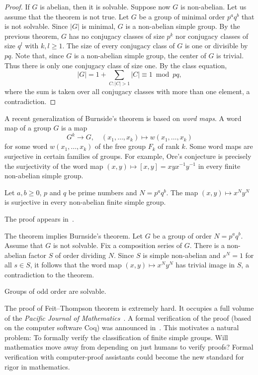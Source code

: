 \begin{proof}
	If $G$ is abelian, then it is solvable.
	Suppose now $G$ is non-abelian.
	Let us assume that the theorem is not true. Let $G$ be a group
	of minimal order $p^aq^b$
	that is not solvable. Since $|G|$ is minimal, $G$ is a non-abelian simple group.
	By the previous theorem, 
	$G$ has no conjugacy classes of size $p^k$ nor 
	conjugacy classes of size $q^l$ with $k,l\geq1$. The size
	of every conjugacy class of $G$ is one or divisible by $pq$. 
	Note that, since $G$ is a non-abelian simple group,
	the center of $G$ is trivial.
	Thus there is only one conjugacy class of size one.
	By the class
	equation,
	\[
		|G|=1+\sum_{C:|C|>1}|C|\equiv 1 \bmod pq,
	\]
	where the sum is taken over all conjugacy classes 
	with more than one element, a contradiction.
\end{proof}

A recent generalization of Burnside's theorem
is based on \emph{word maps}. A word map
of a group $G$ is a map 
\[
G^k\to G,\quad 
(x_1,\dots,x_k)\mapsto w(x_1,\dots,x_k)
\]
for some word $w(x_1,\dots,x_k)$ of the free group $F_k$ of rank $k$. 
Some word maps are surjective in certain families of groups. For example, 
Ore's conjecture is precisely the surjectivity of the word map
$(x,y)\mapsto [x,y]=xyx^{-1}y^{-1}$ in every finite non-abelian simple 
group. 

\begin{theorem}
    Let $a,b\geq0$, $p$ and $q$ be prime numbers and $N=p^aq^b$. The map 
    $(x,y)\mapsto x^Ny^N$ is surjective in every non-abelian 
    finite simple group. 
\end{theorem}

The proof appears in~\cite{MR3827208}. 

The theorem implies Burnside's theorem. Let $G$ be a group of order
$N=p^aq^b$. Assume that $G$ is not solvable. 
Fix a composition series of $G$. There is a non-abelian factor $S$ 
of order dividing $N$. Since 
$S$ is simple non-abelian and $s^N=1$ for all $s\in S$, 
it follows that the word map
$(x,y)\mapsto x^Ny^N$ has trivial image in $S$, a contradiction 
to the theorem. 

\begin{theorem}
    Groups of odd order are solvable. 
\end{theorem}

The proof of Feit--Thompson theorem is extremely hard. 
It occupies a full volume of the 
\emph{Pacific Journal of Mathematics}~\cite{MR166261}. 
A formal verification of the proof 
(based on the computer software Coq) 
was announced in~\cite{MR3111271}.  This motivates a natural problem: To formally verify 
the classification of finite simple groups.  
Will mathematics move away from depending on just humans to verify proofs? Formal verification with computer-proof assistants 
could become the new standard for rigor in mathematics. 

